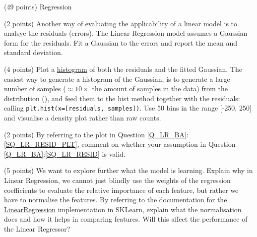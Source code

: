 \documentclass[12pt]{article}
\begin{document}
\begin{question}{\label{Q_LR_BA}(49 points) Regression}
\begin{subquestion}



\end{subquestion}



\begin{subquestion}{\label{SQ_LR_RESID}(2 points) Another way of evaluating the applicability of a linear model is to analsye the residuals (errors). The Linear Regression model assumes a Gaussian form for the residuals. Fit a Gaussian to the errors and report the mean and standard deviation.}






\end{subquestion}

\begin{subquestion}{\label{SQ_LR_RESID_PLT}(4 points) Plot a \href{https://matplotlib.org/3.1.1/api/_as_gen/matplotlib.pyplot.hist.html}{histogram} of both the residuals and the fitted Gaussian. The easiest way to generate a histogram of the Gaussian, is to generate a large number of samples ($\approx10\times$ the amount of samples in the data) from the distribution (), and feed them to the hist method together with the residuals: \ie calling \texttt{plt.hist(x=[residuals, samples])}. Use 50 bins in the range [-250, 250] and visualise a density plot rather than raw counts.}






\end{subquestion}

\begin{subquestion}{(2 points) By referring to the plot in Question \ref{Q_LR_BA}:\ref{SQ_LR_RESID_PLT}, comment on whether your assumption in Question \ref{Q_LR_BA}:\ref{SQ_LR_RESID} is valid.}






\end{subquestion}



\begin{subquestion}{(5 points) We want to explore further what the model is learning. Explain why in Linear Regression, we cannot just blindly use the weights of the regression coefficients to evaluate the relative importance of each feature, but rather we have to normalise the features. By referring to the documentation for the \href{http://scikit-learn.org/stable/modules/generated/sklearn.linear_model.LinearRegression.html}{LinearRegression} implementation in SKLearn, explain what the normalisation does and how it helps in comparing features. Will this affect the performance of the Linear Regressor?}




\end{subquestion}
\end{question}
\end{document}
